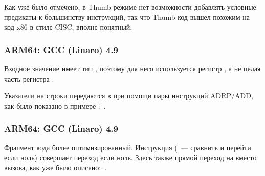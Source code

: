 Как уже было отмечено, в Thumb-режиме нет возможности добавлять условные предикаты к большинству инструкций,
так что Thumb-код вышел похожим на код x86 в стиле \ac{CISC}, вполне понятный.

\subsubsection{ARM64: \NonOptimizing GCC (Linaro) 4.9}



Входное значение имеет тип \Tint, поэтому для него используется регистр ,
а не целая часть регистра .

Указатели на строки передаются в \puts при помощи пары инструкций ADRP/ADD, как было показано в примере
\q{\HelloWorldSectionName}:~.

\subsubsection{ARM64: \Optimizing GCC (Linaro) 4.9}



Фрагмент кода более оптимизированный.
Инструкция  (~--- сравнить и перейти если ноль) совершает переход если  ноль.
Здесь также прямой переход на \puts вместо вызова, как уже было описано:~.

